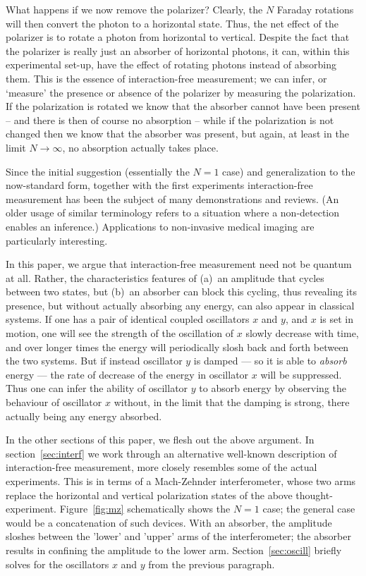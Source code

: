 \documentclass[12pt,aps,prb,preprint]{revtex4}
\begin{document}
What happens if we now remove the polarizer?  Clearly, the $N$ Faraday
rotations will then convert the photon to a horizontal state.  Thus,
the net effect of the polarizer is to rotate a photon from horizontal
to vertical.  Despite the fact that the polarizer is really just an
absorber of horizontal photons, it can, within this experimental
set-up, have the effect of rotating photons instead of absorbing them.
This is the essence of interaction-free measurement; we can infer, or
`measure' the presence or absence of the polarizer by measuring the
polarization.  If the polarization is rotated we know that the
absorber cannot have been present -- and there is then of course no
absorption -- while if the polarization is not changed then we know
that the absorber was present, but again, at least in the limit $N
\rightarrow \infty$, no absorption actually takes place.

Since the initial suggestion (essentially the $N=1$
case)\cite{1993FoPh...23..987E} and generalization to the now-standard
form, together with the first experiments\cite{PhysRevLett.74.4763}
interaction-free measurement has been the subject of many
demonstrations\cite{PhysRevA.57.3987,voorthuysen:1504,2006JPhB...39.3177N}
and reviews.\cite{deweerd:272} (An older usage of similar
terminology\cite{springerlink:10.1007/BF01327019,dicke:925} refers to
a situation where a non-detection enables an inference.)  Applications
to non-invasive medical imaging\cite{PhysRevA.80.040902} are
particularly interesting.

In this paper, we argue that interaction-free measurement need not be
quantum at all.  Rather, the characteristics features of (a)~an
amplitude that cycles between two states, but (b)~an absorber can
block this cycling, thus revealing its presence, but without actually
absorbing any energy, can also appear in classical systems.  If one
has a pair of identical coupled oscillators $x$ and $y$, and $x$ is
set in motion, one will see the strength of the oscillation of $x$
slowly decrease with time, and over longer times the energy will
periodically slosh back and forth between the two systems.  But if
instead oscillator $y$ is damped --- so it is able to {\em absorb\/}
energy --- the rate of decrease of the energy in oscillator $x$ will
be suppressed.  Thus one can infer the ability of oscillator $y$ to
absorb energy by observing the behaviour of oscillator $x$ without, in
the limit that the damping is strong, there actually being any energy
absorbed.

In the other sections of this paper, we flesh out the above argument.
In section~\ref{sec:interf} we work through an alternative well-known
description of interaction-free measurement, more closely resembles
some of the actual experiments.  This is in terms of a Mach-Zehnder
interferometer, whose two arms replace the horizontal and vertical
polarization states of the above thought-experiment.
Figure~\ref{fig:mz} schematically shows the $N=1$ case; the general
case would be a concatenation of such devices.  With an absorber, the
amplitude sloshes between the 'lower' and 'upper' arms of the
interferometer; the absorber results in confining the amplitude to the
lower arm.  Section~\ref{sec:oscill} briefly solves for the
oscillators $x$ and $y$ from the previous paragraph.
\end{document}
